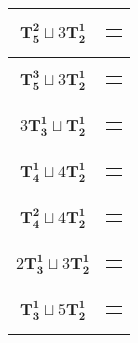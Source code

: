 \documentclass{article}
\begin{document}
\begin{longtable}{|c|c|}
    $\mathbf{T_{5}^{2}} \sqcup 3\mathbf{T_{2}^{1}}$ & \begin{tabular}{@{}l@{}} $(6,1,8,4,7)\sqcup(3,5)\sqcup(9,12)\sqcup(10,11)$ \end{tabular} \\ \hline
    $\mathbf{T_{5}^{3}} \sqcup 3\mathbf{T_{2}^{1}}$ & \begin{tabular}{@{}l@{}} $(3,0,4,5,6)\sqcup(8,1)\sqcup(10,11)\sqcup(9,7)$ \end{tabular} \\ \hline
    $3\mathbf{T_{3}^{1}} \sqcup \mathbf{T_{2}^{1}}$ & \begin{tabular}{@{}l@{}} $(0,6,1)\sqcup(4,8,5)\sqcup(2,9,7)\sqcup(10,11)$ \end{tabular} \\ \hline
    $\mathbf{T_{4}^{1}} \sqcup 4\mathbf{T_{2}^{1}}$ & \begin{tabular}{@{}l@{}} $(0,6,1,5)\sqcup(9,2)\sqcup(8,10)\sqcup(4,7)\sqcup(11,12)$ \end{tabular} \\ \hline
    $\mathbf{T_{4}^{2}} \sqcup 4\mathbf{T_{2}^{1}}$ & \begin{tabular}{@{}l@{}} $(4,0,5,6)\sqcup(2,3)\sqcup(9,11)\sqcup(8,1)\sqcup(10,7)$ \end{tabular} \\ \hline
    $2\mathbf{T_{3}^{1}} \sqcup 3\mathbf{T_{2}^{1}}$ & \begin{tabular}{@{}l@{}} $(0,6,1)\sqcup(4,8,5)\sqcup(10,3)\sqcup(9,7)\sqcup(11,12)$ \end{tabular} \\ \hline
    $\mathbf{T_{3}^{1}} \sqcup 5\mathbf{T_{2}^{1}}$ & \begin{tabular}{@{}l@{}} $(0,6,1)\sqcup(8,4)\sqcup(2,5)\sqcup(10,3)\sqcup(9,7)\sqcup(11,12)$ \end{tabular} \\ \hline

\end{longtable}%
\end{document}
